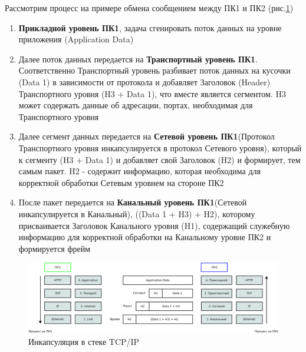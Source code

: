 \documentclass[a4paper]{article}
\begin{document}
Рассмотрим процесс на примере обмена сообщением между ПК1 и ПК2 (рис.\ref{fig:pic-12-tcpip-incapsulation})
\begin{enumerate}
	\item \textbf{Прикладной уровень ПК1}, задача сгенировать поток данных на уровне приложения (Application Data)
	\item Далее поток данных передается на \textbf{Транспортный уровень ПК1}. Соответственно Транспортный уровень разбивает поток данных на кусочки (Data 1) в зависимости от протокола и добавляет Заголовок (Header) Транспортного уровня (H3 + Data 1), что вместе является сегментом. H3 может содержать данные об адресации, портах, необходимая для Транспортного уровня
	\item Далее сегмент данных передается на \textbf{Сетевой уровень ПК1}(Протокол Транспортного уровня инкапсулируется в протокол Сетевого уровня), который к сегменту (H3 + Data 1) и добавляет свой Заголовок (H2) и формирует, тем самым пакет. H2 - содержит информацию, которая необходима для корректной обработки Сетевым уровнем на стороне ПК2
	\item После пакет передается на \textbf{Канальный уровень ПК1}(Сетевой инкапсулируется в Канальный), ((Data 1 + H3) + H2), которому присваивается Заголовок Канального уровня (H1), содержащий служебную информацию для корректной обработки на Канальному уровне ПК2 и формируется фрейм
\end{enumerate}

\begin{figure}[!h]
	\centering
	\includegraphics[width=\textwidth]{12-tcpip-incapsulation}
	\caption{Инкапсуляция в стеке TCP/IP}
	\label{fig:pic-12-tcpip-incapsulation}
\end{figure}
\end{document}
